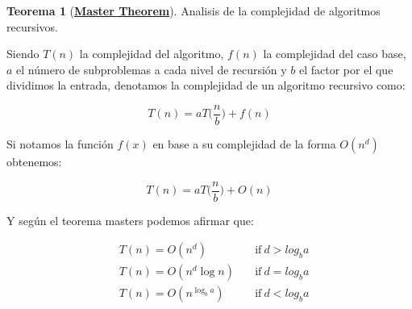 \documentclass[12pt]{article}
\theoremstyle{definition}
\theoremstyle{definition}
\theoremstyle{definition}
\theoremstyle{definition}
\theoremstyle{definition}
\theoremstyle{definition}
\newtheorem{teo}{Teorema}
\theoremstyle{definition}
\begin{document}
\begin{teo}[\href{https://en.wikipedia.org/wiki/Master_theorem_(analysis_of_algorithms)}{\textbf{Master Theorem}}]
Analisis de la complejidad de algoritmos recursivos.

Siendo $T(n)$ la complejidad del algoritmo, $f(n)$ la complejidad del caso base, $a$ el número de subproblemas a cada nivel de recursión y $b$ el factor por el que dividimos la entrada, denotamos la complejidad de un algoritmo recursivo como:

\[
T(n) = aT\big(\frac{n}{b}\big)+f(n)
\]

Si notamos la función $f(x)$ en base a su complejidad de la forma $O(n^d)$ obtenemos:

\[
T(n) = aT\big(\frac{n}{b}\big)+O(n)
\]

Y según el teorema masters podemos afirmar que:

\begin{equation*}
\begin{aligned}
	& T(n)=O(n^d) \quad & \textrm{if}\: d>log_b a\\
	& T(n)=O(n^d\log n) \quad & \textrm{if}\: d=log_b a\\
	& T(n)=O(n^{\log_b{a}}) \quad & \textrm{if}\: d<log_b a
\end{aligned}
\end{equation*}
\end{teo}
\end{document}
